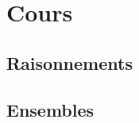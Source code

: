 
%
%
%

\makeatletter
\newcommand\BOVp@throot{../..}
\newcommand\BOVp@thcontent{\BOVp@throot/Content}
\newcommand\BOVp@thinput{\BOVp@thcontent/Input}
\newcommand\BOVinput[1]{}
\makeatother

\RequirePackage{./preamble}



\BOVinput{page-title.tex}
\BOVinput{page-copyright.tex}




\pagestyle{empty} %

\tableofcontents %

\cleardoublepage %

\pagestyle{fancy} %


\BOVinput{Présentation.tex}

\part{Cours}

\chapter{Raisonnements}
\BOVinput{01-Raisonnement.tex}
\chapter{Ensembles}
\BOVinput{02-Ensembles.tex}
